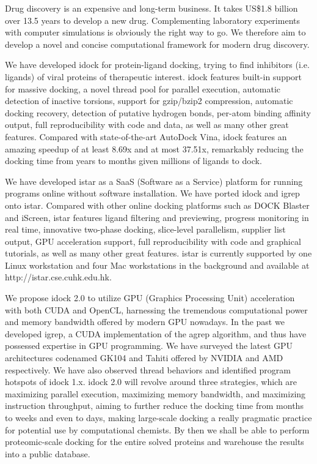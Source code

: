 Drug discovery is an expensive and long-term business. It takes US\$1.8 billion over 13.5 years to develop a new drug. Complementing laboratory experiments with computer simulations is obviously the right way to go. We therefore aim to develop a novel and concise computational framework for modern drug discovery.

We have developed idock for protein-ligand docking, trying to find inhibitors (i.e. ligands) of viral proteins of therapeutic interest. idock features built-in support for massive docking, a novel thread pool for parallel execution, automatic detection of inactive torsions, support for gzip/bzip2 compression, automatic docking recovery, detection of putative hydrogen bonds, per-atom binding affinity output, full reproducibility with code and data, as well as many other great features. Compared with state-of-the-art AutoDock Vina, idock features an amazing speedup of at least 8.69x and at most 37.51x, remarkably reducing the docking time from years to months given millions of ligands to dock.

We have developed istar as a SaaS (Software as a Service) platform for running programs online without software installation. We have ported idock and igrep onto istar. Compared with other online docking platforms such as DOCK Blaster and iScreen, istar features ligand filtering and previewing, progress monitoring in real time, innovative two-phase docking, slice-level parallelism, supplier list output, GPU acceleration support, full reproducibility with code and graphical tutorials, as well as many other great features. istar is currently supported by one Linux workstation and four Mac workstations in the background and available at http://istar.cse.cuhk.edu.hk.

We propose idock 2.0 to utilize GPU (Graphics Processing Unit) acceleration with both CUDA and OpenCL, harnessing the tremendous computational power and memory bandwidth offered by modern GPU nowadays. In the past we developed igrep, a CUDA implementation of the agrep algorithm, and thus have possessed expertise in GPU programming. We have surveyed the latest GPU architectures codenamed GK104 and Tahiti offered by NVIDIA and AMD respectively. We have also observed thread behaviors and identified program hotspots of idock 1.x. idock 2.0 will revolve around three strategies, which are maximizing parallel execution, maximizing memory bandwidth, and maximizing instruction throughput, aiming to further reduce the docking time from months to weeks and even to days, making large-scale docking a really pragmatic practice for potential use by computational chemists. By then we shall be able to perform proteomic-scale docking for the entire solved proteins and warehouse the results into a public database.

